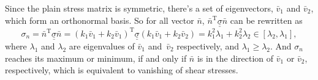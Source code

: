 \documentclass{article}
\begin{document}
Since the plain stress matrix is symmetric, there's a set of eigenvectors,
$\bar{v}_{1}$ and $\bar{v}_{2}$, which form an orthonormal basis.
So for all vector $\bar{n}$,
$\bar{n}^{\mathrm{T}} \underline{\underline{\sigma}} \bar{n}$
can be rewritten as
\[
\sigma_{n} = \bar{n}^{\mathrm{T}} \underline{\underline{\sigma}} \bar{n} = 
(k_{1} \bar{v}_1 + k_{2} \bar{v}_1)^{\mathrm{T}}
\underline{\underline{\sigma}}
(k_{1} \bar{v}_1 + k_{2} \bar{v}_2) =
k_{1}^2 \lambda_{1} + k_{2}^2 \lambda_{2} \in [\lambda_{2}, \lambda_{1}],
\]
where $\lambda_{1}$ and $\lambda_{2}$ are eigenvalues of
$\bar{v}_{1}$ and~$\bar{v}_{2}$ respectively, and $\lambda_{1} \ge \lambda_{2}$.
And $\sigma_{n}$ reaches its maximum or minimum,
if and only if $\bar{n}$ is in the direction of $\bar{v}_{1}$ or $\bar{v}_{2}$,
respectively, which is equivalent to vanishing of shear stresses.
\end{document}
